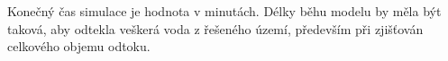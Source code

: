 

Konečný čas simulace je hodnota v minutách. Délky běhu modelu by měla být taková, aby odtekla veškerá voda z řešeného území, především při zjišťován celkového objemu odtoku.
 

















